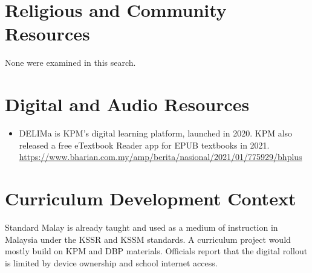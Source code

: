 \documentclass[12pt]{article}
\begin{document}
\section{Religious and Community Resources}
None were examined in this search.

\section{Digital and Audio Resources}
\begin{itemize}
\item DELIMa is KPM's digital learning platform, launched in 2020. KPM also released a free eTextbook Reader app for EPUB textbooks in 2021. \url{https://www.bharian.com.my/amp/berita/nasional/2021/01/775929/bhplus}
\end{itemize}

\section{Curriculum Development Context}
Standard Malay is already taught and used as a medium of instruction in Malaysia under the KSSR and KSSM standards. A curriculum project would mostly build on KPM and DBP materials. Officials report that the digital rollout is limited by device ownership and school internet access.
\end{document}

